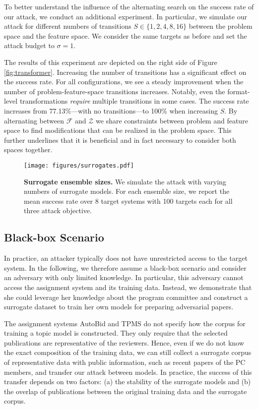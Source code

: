 \documentclass[letterpaper,twocolumn,10pt]{article}
\newcommand{\switches}{S}
\newcommand{\attackbudgetscale}{\sigma}
\newcommand{\Dom}{\ensuremath{\mathcal{Z}}\xspace}
\newcommand{\F}{\ensuremath{\mathcal{F}}\xspace}
\begin{document}
To better understand the influence of the alternating search on the success rate of our attack, we conduct an additional experiment. In particular, we simulate our attack for different numbers of transitions $\switches \in \{1, 2, 4, 8, 16\}$ between the problem space and the feature space. We consider the same targets as before and set the attack budget to $\attackbudgetscale = 1$.

The results of this experiment are depicted on the right side of Figure \ref{fig:transformer}. Increasing the number of transitions has a significant effect on the success rate. For all configurations, we see a steady improvement when the number of problem-feature-space transitions increases.
Notably, even the format-level transformations \emph{require} multiple transitions in some cases. The success rate increases from 77.13\%---with no transitions---to 100\% when increasing $\switches$. By alternating between $\F$ and $\Dom$ we share constraints between problem and feature space to find modifications that can be realized in the problem space. This further underlines that it is beneficial and in fact necessary to consider both spaces together.

\begin{figure}[t]
    \centering
  	\texttt{[image: figures/surrogates.pdf]}
    \caption{\textbf{Surrogate ensemble sizes.} We simulate the attack with varying numbers of surrogate models. For each ensemble size, we report the mean success rate over 8 target systems with 100 targets each for all three attack objective.}
    \label{fig:surrogates}
\end{figure} \subsection{Black-box Scenario} 

In practice, an attacker typically does not have unrestricted access to the target system. In the following, we therefore assume a black-box scenario and consider an adversary with only limited knowledge. In particular, this adversary cannot access the assignment system and its training data. Instead, we demonstrate that she could leverage her knowledge about the program committee and construct a surrogate dataset to train her own models for preparing adversarial papers.

The assignment systems AutoBid and TPMS do not specify how the corpus for training a topic model is constructed. They only require that the selected publications are representative of the reviewers. Hence, even if we do not know the exact composition of the training data, we can still collect a surrogate corpus of representative data with public information, such as recent papers of the PC members, and transfer our attack between models. In practice, the success of this transfer depends on two factors: (a) the stability of the surrogate models and (b) the overlap of publications between the original training data and the surrogate corpus.
\end{document}
